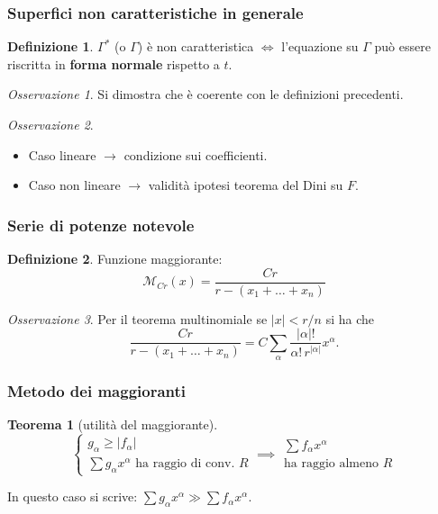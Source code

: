 \documentclass[serif,notheorems]{beamer}
\theoremstyle{definition} %
\newtheorem{theorem}{Teorema}[section] %
\newtheorem{definition}{Definizione}[section] %
\theoremstyle{remark}
\newtheorem*{remark}{Osservazione}
\begin{document}
\begin{frame}
\frametitle{Superfici non caratteristiche in generale}
\begin{definition}
$\Gamma^*$ (o $\Gamma$) è non caratteristica $\iff$ l'equazione su $\Gamma$ può essere riscritta in \textbf{forma normale} rispetto a $t$.
\end{definition}
\begin{remark}
Si dimostra che è coerente con le definizioni precedenti.
\end{remark}
\begin{remark}
\begin{itemize}
\item Caso lineare $\rightarrow$ condizione sui coefficienti.
\item Caso non lineare $\rightarrow$ validità ipotesi teorema del Dini su $F$.
\end{itemize}
\end{remark}
\end{frame}


\begin{frame}
\frametitle{Serie di potenze notevole}
\begin{definition}
Funzione maggiorante: $$\mathcal{M}_{Cr}(x)=\frac{Cr}{r-(x_1+\ldots +x_n)}$$
\end{definition}
\begin{remark}
Per il teorema multinomiale se $|x|<r/n$ si ha che
$$\frac{Cr}{r-(x_1+\ldots +x_n)}=C \sum\limits_\alpha \frac{|\alpha |!}{\alpha ! \, r^{|\alpha |}} x^\alpha.$$
\end{remark}
\end{frame}

\begin{frame}
\frametitle{Metodo dei maggioranti}
\begin{theorem}[utilità del maggiorante]
\begin{equation*}
\begin{cases}
g_\alpha \geq |f_\alpha|\\
\sum g_\alpha x^\alpha \text{ ha raggio di conv. } R
\end{cases}
\implies 
\begin{array}{c}
\sum f_\alpha x^\alpha \\
\text{ha raggio almeno } R
\end{array}
\end{equation*}
\end{theorem}
In questo caso si scrive:  $\sum g_\alpha x^\alpha \gg \sum f_\alpha x^\alpha$.
\end{frame}
\end{document}

